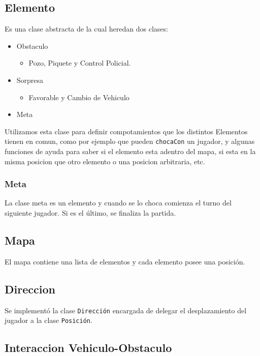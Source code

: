 \documentclass[titlepage,a4paper]{article}
\begin{document}
\subsection{Elemento}
\label{sec:orge42d5d2}

Es una clase abstracta de la cual heredan dos clases:

\begin{itemize}
\item Obstaculo
\begin{itemize}
\item Pozo, Piquete y Control Policial.
\end{itemize}
\item Sorpresa
\begin{itemize}
\item Favorable y Cambio de Vehiculo
\end{itemize}
\item Meta
\end{itemize}

Utilizamos esta clase para definir compotamientos que los distintos
Elementos tienen en comun, como por ejemplo que pueden \texttt{chocaCon} un
jugador, y algunas funciones de ayuda para saber si el elemento esta
adentro del mapa, si esta en la misma posicion que otro elemento o una
posicion arbitraria, etc.

\subsubsection{Meta}
\label{sec:org400f5d4}
La clase meta es un elemento y cuando se lo choca comienza el turno
del siguiente jugador. Si es el último, se finaliza la partida.

\subsection{Mapa}
\label{sec:org1a6732f}

El mapa contiene una lista de elementos y cada elemento posee una posición.

\subsection{Direccion}
\label{sec:org03c1ff7}
Se implementó la clase \texttt{Dirección} encargada de delegar el
desplazamiento del jugador a la clase \texttt{Posición}.

\subsection{Interaccion Vehiculo-Obstaculo}
\label{sec:org4dbe90e}
\end{document}

